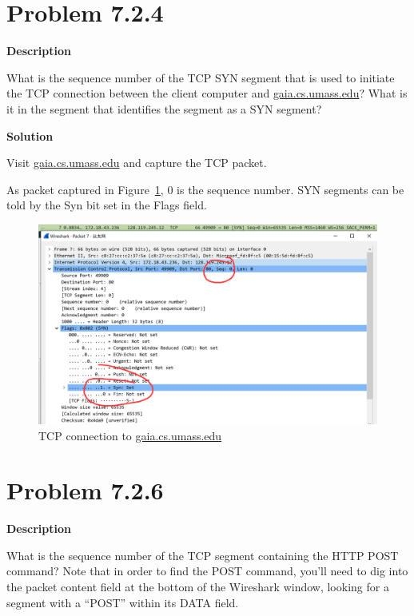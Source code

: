 \documentclass[12pt,letterpaper]{ctexart}
\begin{document}
\newpage

\section*{Problem 7.2.4}

{\bf Description}

What is the sequence number of the TCP SYN segment that is used to initiate the TCP connection between the client computer and \href{gaia.cs.umass.edu}{gaia.cs.umass.edu}?
What is it in the segment that identifies the segment as a SYN segment?


{\bf Solution}

Visit \href{gaia.cs.umass.edu}{gaia.cs.umass.edu} and capture the TCP packet.

As packet captured in Figure~\ref{fig:tcp}, 0 is the sequence number. SYN segments can be told by the Syn bit set in the Flags field.

\begin{figure}[H]
  \centering
  \includegraphics[width=\linewidth]{assets/tcp.png}
  \caption{TCP connection to \href{gaia.cs.umass.edu}{gaia.cs.umass.edu}}
  \label{fig:tcp}
\end{figure}

\newpage


\section*{Problem 7.2.6}

{\bf Description}

What is the sequence number of the TCP segment containing the HTTP POST command?
Note that in order to find the POST command, you’ll need to dig into the packet content field at the bottom of the Wireshark window, looking for a segment with a “POST” within its DATA field.
\end{document}
